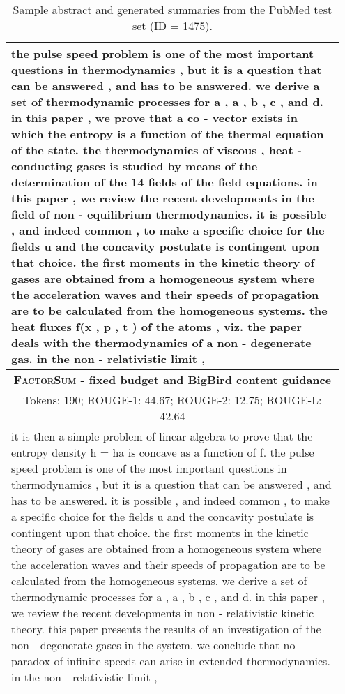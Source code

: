 \documentclass[11pt,table]{article}
\newcommand{\modelname}{FactorSum}
\begin{document}
\begin{table*}[ht]
\begin{tabular}{p{0.95\linewidth}}
    \midrule
    the pulse speed problem is one of the most important questions in thermodynamics , but it is a question that can be answered , and has to be answered. we derive a set of thermodynamic processes for a , a , b , c , and d. in this paper , we prove that a co - vector exists in which the entropy is a function of the thermal equation of the state. the thermodynamics of viscous , heat - conducting gases is studied by means of the determination of the 14 fields   of the field equations. in this paper , we review the recent developments in the field of non - equilibrium thermodynamics. it is possible , and indeed common , to make a specific choice for the fields u and the concavity postulate is contingent upon that choice. the first moments in the kinetic theory of gases are obtained from a homogeneous system   where the acceleration waves and their speeds of propagation are to be calculated from the homogeneous systems. the heat fluxes f(x , p , t ) of the atoms , viz. the paper deals with the thermodynamics of a non - degenerate gas. in the non - relativistic limit , \\
    \midrule
    \multicolumn{1}{c}{\textbf{\textsc{\modelname} - fixed budget and BigBird content guidance}} \\
    \multicolumn{1}{c}{Tokens: 190; ROUGE-1: 44.67; ROUGE-2: 12.75; ROUGE-L: 42.64} \\
    \midrule
    it is then a simple problem of linear algebra to prove that the entropy density h = ha is concave as a function of f. the pulse speed problem is one of the most important questions in thermodynamics , but it is a question that can be answered , and has to be answered. it is possible , and indeed common , to make a specific choice for the fields u and the concavity postulate is contingent upon that choice. the first moments in the kinetic theory of gases are obtained from a homogeneous system   where the acceleration waves and their speeds of propagation are to be calculated from the homogeneous systems. we derive a set of thermodynamic processes for a , a , b , c , and d. in this paper , we review the recent developments in non - relativistic kinetic theory. this paper presents the results of an investigation of the non - degenerate gases in the system. we conclude that no paradox of infinite speeds can arise in extended thermodynamics. in the non - relativistic limit , \\
    \bottomrule
  \end{tabular}
  \caption{Sample abstract and generated summaries from the PubMed test set (ID = 1475).} \label{tab:summary_sample_pubmed2}
\end{table*}
\end{document}
